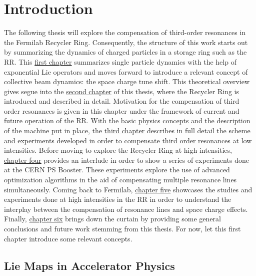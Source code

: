 \chapter{Introduction}
\label{sec:ch1}

The following thesis will explore the compensation of third-order resonances in the Fermilab Recycler Ring. Consequently, the structure of this work starts out by summarizing the dynamics of charged particles in a storage ring such as the RR. This \hyperref[sec:ch1]{first chapter} summarizes single particle dynamics with the help of exponential Lie operators and moves forward to introduce a relevant concept of collective beam dynamics: the space charge tune shift. This theoretical overview gives segue into the \hyperref[sec:ch2]{second chapter} of this thesis, where the Recycler Ring is introduced and described in detail. Motivation for the compensation of third order resonances is given in this chapter under the framework of current and future operation of the RR. With the basic physics concepts and the description of the machine put in place, the \hyperref[sec:ch3]{third chapter} describes in full detail the scheme and experiments developed in order to compensate third order resonances at low intensities. Before moving to explore the Recycler Ring at high intensities, \hyperref[sec:ch4]{chapter four} provides an interlude in order to show a series of experiments done at the CERN PS Booster. These experiments explore the use of advanced optimization algorithms in the aid of compensating multiple resonance lines simultaneously. Coming back to Fermilab, \hyperref[sec:ch5]{chapter five} showcases the studies and experiments done at high intensities in the RR in order to understand the interplay between the compensation of resonance lines and space charge effects. Finally, \hyperref[sec:ch6]{chapter six} brings down the curtain by providing some general conclusions and future work stemming from this thesis. For now, let this first chapter introduce some relevant concepts.

\section{Lie Maps in Accelerator Physics}

